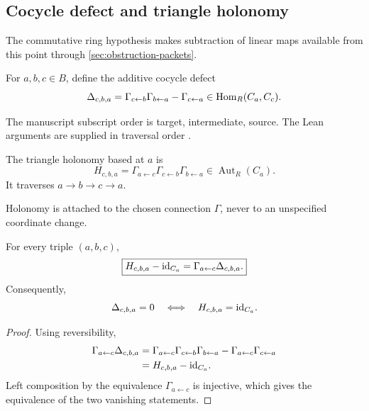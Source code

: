 \subsection{Cocycle defect and triangle holonomy}

The commutative ring hypothesis makes subtraction of linear maps available
from this point through \cref{sec:obstruction-packets}.

\begin{definition}
\label{def:cocycle-defect}
For $a,b,c\in B$, define the additive cocycle defect
\[
\Delta_{c,b,a}
=
\Gamma_{c\leftarrow b}\Gamma_{b\leftarrow a}
-\Gamma_{c\leftarrow a}
\in\operatorname{Hom}_R(C_a,C_c).
\]
\end{definition}

The manuscript subscript order is target, intermediate, source.  The Lean
arguments are supplied in traversal order .

\begin{definition}
\label{def:triangle-holonomy}
The triangle holonomy based at $a$ is
\[
H_{c,b,a}
=
\Gamma_{a\leftarrow c}
\Gamma_{c\leftarrow b}
\Gamma_{b\leftarrow a}
\in\operatorname{Aut}_R(C_a).
\]
It traverses $a\to b\to c\to a$.
\end{definition}

Holonomy is attached to the chosen connection $\Gamma$, never to an
unspecified coordinate change.

\begin{theorem}
\label{thm:defect-holonomy}
For every triple $(a,b,c)$,
\[
\boxed{
H_{c,b,a}-\mathrm{id}_{C_a}
=
\Gamma_{a\leftarrow c}\Delta_{c,b,a}.
}
\]
Consequently,
\[
\Delta_{c,b,a}=0
\quad\Longleftrightarrow\quad
H_{c,b,a}=\mathrm{id}_{C_a}.
\]
\end{theorem}

\begin{proof}
Using reversibility,
\[
\begin{aligned}
\Gamma_{a\leftarrow c}\Delta_{c,b,a}
&=
\Gamma_{a\leftarrow c}
\Gamma_{c\leftarrow b}
\Gamma_{b\leftarrow a}
-
\Gamma_{a\leftarrow c}\Gamma_{c\leftarrow a}\\
&=H_{c,b,a}-\mathrm{id}_{C_a}.
\end{aligned}
\]
Left composition by the equivalence $\Gamma_{a\leftarrow c}$ is injective,
which gives the equivalence of the two vanishing statements.
\end{proof}

